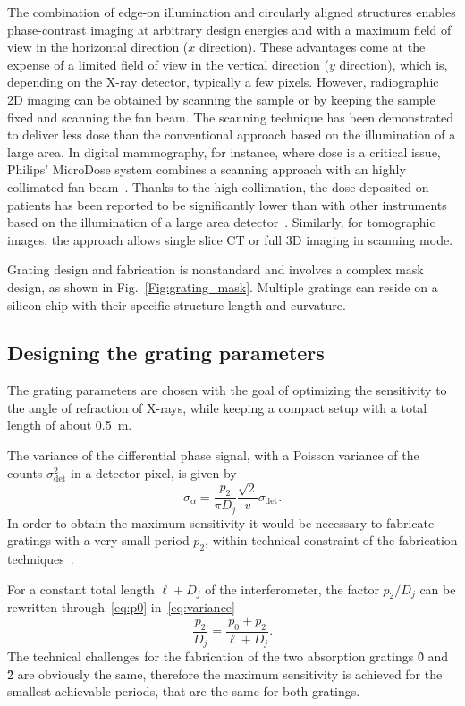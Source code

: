The combination of edge-on illumination and circularly aligned structures
enables phase-contrast imaging at arbitrary design energies and with a
maximum field of view in the horizontal direction ($x$ direction). These
advantages come at the expense of a limited field of view in the vertical
direction ($y$ direction), which is, depending on the X-ray detector,
typically a few pixels. However, radiographic 2D imaging can be obtained by
scanning the sample or by keeping the sample fixed and scanning the fan beam. The scanning technique has been
demonstrated to deliver less dose than the conventional approach based on
the illumination of a large area. In digital mammography, for instance,
where dose is a critical issue, Philips' MicroDose system combines a
scanning approach with an highly collimated fan beam~\parencite{Aslund2007}.
Thanks to the high collimation, the dose deposited on  patients has been
reported to be significantly lower than with other instruments based on the
illumination of a large area detector~\parencite{Oduko2010}. Similarly, for
tomographic images, the approach allows single slice \ac{CT} or full 3D
imaging in scanning mode.

Grating design and fabrication is nonstandard and involves a complex mask
design, as shown in Fig.~\ref{Fig:grating_mask}. Multiple gratings can
reside on a silicon chip with their specific structure length and curvature.

\subsection{Designing the grating parameters}
The grating parameters are chosen with the goal of optimizing the
sensitivity to the angle of refraction of X-rays, while keeping a compact
setup with a total length of about \SI{0.5}{\meter}.

The variance of the differential phase signal, with a Poisson variance of
the counts $\sigma_{\text{det}}^2$ in a detector pixel, is given by~\parencite{Raupach2011}
\begin{equation}
    \sigma_\alpha = \frac{p_2}{\pi D_j}
    \frac{\sqrt{2}}{v}\sigma_{\text{det}}.\label{eq:variance}
\end{equation}
In order to obtain the maximum sensitivity it would be necessary to
fabricate gratings with a very small period
$p_2$, within technical constraint of the fabrication
techniques~\parencite{David2007,Kenntner2010}.

For a constant total length $\ell + D_j$ of the interferometer, the factor
$p_2/D_j$ can be rewritten through~\eqref{eq:p0} in~\eqref{eq:variance}
\begin{equation}
    \frac{p_2}{D_j} = \frac{p_0 + p_2}{\ell + D_j}.
\end{equation}
The technical challenges for the fabrication of the two absorption gratings
\G0 and \G2 are obviously the same, therefore the maximum sensitivity is
achieved for the smallest achievable periods, that are the same for both
gratings.


